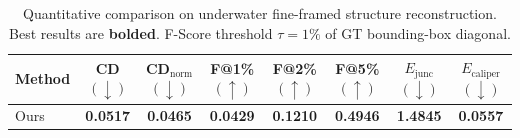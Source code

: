\begin{table}[t]
  \centering
  \caption{Quantitative comparison on underwater fine-framed structure reconstruction. Best results are \textbf{bolded}. F-Score threshold $\tau = 1\%$ of GT bounding-box diagonal.}
  \label{tab:quantitative}
  \setlength{\tabcolsep}{6pt}
  \begin{tabular}{lccccccc}
    \toprule
    Method & CD $(\downarrow)$ & CD$_{\text{norm}}$ $(\downarrow)$ & F@1\% $(\uparrow)$ & F@2\% $(\uparrow)$ & F@5\% $(\uparrow)$ & $E_{\text{junc}}$ $(\downarrow)$ & $E_{\text{caliper}}$ $(\downarrow)$ \\
    \midrule
    Ours & \textbf{0.0517} & \textbf{0.0465} & \textbf{0.0429} & \textbf{0.1210} & \textbf{0.4946} & \textbf{1.4845} & \textbf{0.0557} \\
    \bottomrule
  \end{tabular}
\end{table}
